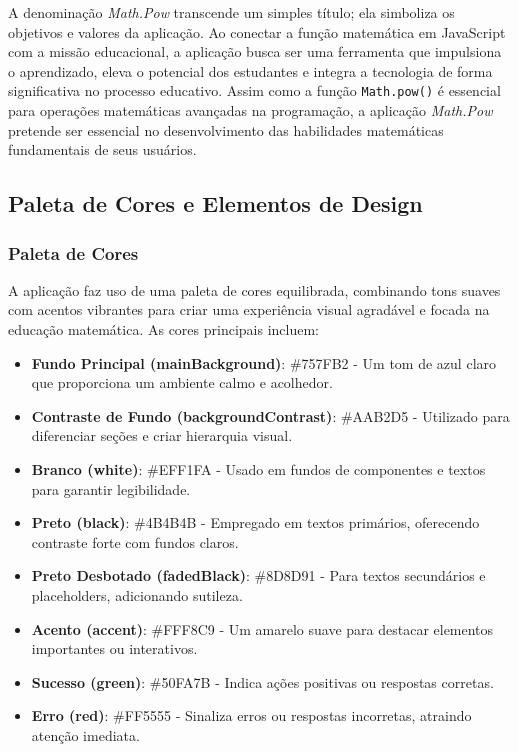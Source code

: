 A denominação \textit{Math.Pow} transcende um simples título; ela simboliza os objetivos e valores da aplicação. Ao conectar a função matemática em JavaScript com a missão educacional, a aplicação busca ser uma ferramenta que impulsiona o aprendizado, eleva o potencial dos estudantes e integra a tecnologia de forma significativa no processo educativo. Assim como a função \texttt{Math.pow()} é essencial para operações matemáticas avançadas na programação, a aplicação \textit{Math.Pow} pretende ser essencial no desenvolvimento das habilidades matemáticas fundamentais de seus usuários.


\subsection{Paleta de Cores e Elementos de Design}

\subsubsection{Paleta de Cores}

A aplicação faz uso de uma paleta de cores equilibrada, combinando tons suaves com acentos vibrantes para criar uma experiência visual agradável e focada na educação matemática. As cores principais incluem:

\begin{itemize}
    \item \textbf{Fundo Principal (mainBackground)}: \#757FB2 - Um tom de azul claro que proporciona um ambiente calmo e acolhedor.
    \item \textbf{Contraste de Fundo (backgroundContrast)}: \#AAB2D5 - Utilizado para diferenciar seções e criar hierarquia visual.
    \item \textbf{Branco (white)}: \#EFF1FA - Usado em fundos de componentes e textos para garantir legibilidade.
    \item \textbf{Preto (black)}: \#4B4B4B - Empregado em textos primários, oferecendo contraste forte com fundos claros.
    \item \textbf{Preto Desbotado (fadedBlack)}: \#8D8D91 - Para textos secundários e placeholders, adicionando sutileza.
    \item \textbf{Acento (accent)}: \#FFF8C9 - Um amarelo suave para destacar elementos importantes ou interativos.
    \item \textbf{Sucesso (green)}: \#50FA7B - Indica ações positivas ou respostas corretas.
    \item \textbf{Erro (red)}: \#FF5555 - Sinaliza erros ou respostas incorretas, atraindo atenção imediata.
\end{itemize}

